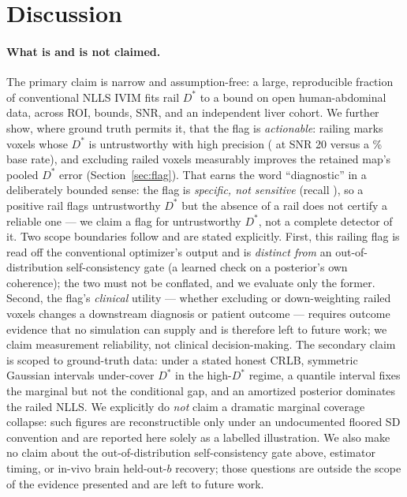 \documentclass[11pt]{article}
\newcommand{\Ds}{D^{*}}
\begin{document}
\section{Discussion}
\label{sec:discussion}

\paragraph{What is and is not claimed.} The primary claim is narrow and
assumption-free: a large, reproducible fraction of conventional NLLS IVIM fits
rail $\Ds$ to a bound on open human-abdominal data, across ROI, bounds, SNR, and
an independent liver cohort. We further show, where ground truth permits it, that
the flag is \emph{actionable}: railing marks voxels whose $\Ds$ is untrustworthy
with high precision (\flagPrecTwenty{} at SNR 20 versus a \flagBaseTwenty\% base
rate), and excluding railed voxels measurably improves the retained map's pooled
$\Ds$ error (Section~\ref{sec:flag}). That earns the word ``diagnostic'' in a
deliberately bounded sense: the flag is \emph{specific, not sensitive} (recall
\flagRecTwenty), so a positive rail flags untrustworthy $\Ds$ but the absence of a
rail does not certify a reliable one --- we claim a flag for untrustworthy $\Ds$,
not a complete detector of it. Two scope boundaries follow and are stated
explicitly. First, this railing flag is read off the conventional optimizer's
output and is \emph{distinct from} an out-of-distribution self-consistency gate
(a learned check on a posterior's own coherence); the two must not be conflated,
and we evaluate only the former. Second, the flag's \emph{clinical} utility ---
whether excluding or down-weighting railed voxels changes a downstream diagnosis
or patient outcome --- requires outcome evidence that no simulation can supply and
is therefore left to future work; we claim measurement reliability, not clinical
decision-making. The secondary claim is scoped to ground-truth data: under a
stated honest CRLB, symmetric Gaussian intervals under-cover $\Ds$ in the
high-$\Ds$ regime, a quantile interval fixes the marginal but not the conditional
gap, and an amortized posterior dominates the railed NLLS. We explicitly do
\emph{not} claim a dramatic marginal coverage collapse: such figures are
reconstructible only under an undocumented floored SD convention and are reported
here solely as a labelled illustration. We also make no claim about the
out-of-distribution self-consistency gate above, estimator timing, or in-vivo
brain held-out-$b$ recovery; those questions are outside the scope of the evidence
presented and are left to future work.
\end{document}
